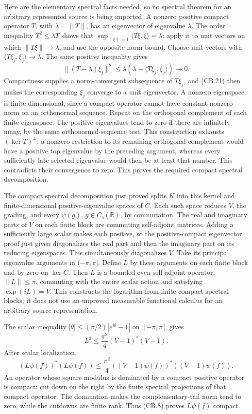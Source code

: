 \documentclass[
  11pt,
]{article}
\begin{document}
Here are the elementary spectral facts needed, so no spectral theorem
for an arbitrary represented source is being imported. A nonzero
positive compact operator \(T\), with \(\lambda=\|T\|\), has an
eigenvector of eigenvalue \(\lambda\). The order inequality
\(T^2\leq\lambda T\) shows that
\(\sup_{\|\xi\|=1}\langle T\xi,\xi\rangle=\lambda\): apply it to unit
vectors on which \(\|T\xi\|\to\lambda\), and use the opposite norm
bound. Choose unit vectors with
\(\langle T\xi_j,\xi_j\rangle\to\lambda\). The same positive inequality
gives \[
 \|(T-\lambda)\xi_j\|^2
 \leq\lambda(\lambda-\langle T\xi_j,\xi_j\rangle)
 \longrightarrow0.
 \tag{CB.21}
\] Compactness supplies a norm-convergent subsequence of \(T\xi_j\), and
(CB.21) then makes the corresponding \(\xi_j\) converge to a unit
eigenvector. A nonzero eigenspace is finite-dimensional, since a compact
operator cannot have constant nonzero norm on an orthonormal sequence.
Repeat on the orthogonal complement of each finite eigenspace. The
positive eigenvalues tend to zero if there are infinitely many, by the
same orthonormal-sequence test. This construction exhausts
\((\ker T)^\perp\): a nonzero restriction to its remaining orthogonal
complement would have a positive top eigenvalue by the preceding
argument, whereas every sufficiently late selected eigenvalue would then
be at least that number. This contradicts their convergence to zero.
This proves the required compact spectral decomposition.

The compact spectral decomposition just proved splits \(K\) into this
kernel and finite-dimensional positive-eigenvalue spaces of \(C\). Each
such space reduces \(V\), the grading, and every \(\psi(g)\),
\(g\in C_b(\mathbb R)\), by commutation. The real and imaginary parts of
\(V\) on each finite block are commuting self-adjoint matrices. Adding a
sufficiently large scalar makes each positive, so the positive-compact
eigenvector proof just given diagonalizes the real part and then the
imaginary part on its reducing eigenspaces. This simultaneously
diagonalizes \(V\). Take its principal eigenvalue arguments in
\((-\pi,\pi]\). Define \(L\) by these arguments on each finite block and
by zero on \(\ker C\). Then \(L\) is a bounded even self-adjoint
operator, \(\|L\|\leq\pi\), commuting with the entire scalar action and
satisfying \(\exp(iL)=V\). This constructs the logarithm from finite
compact spectral blocks; it does not use an unproved measurable
functional calculus for an arbitrary source representation.

The scalar inequality \(|\theta|\leq(\pi/2)|e^{i\theta}-1|\) on
\([-\pi,\pi]\) gives \[
 L^2\leq\frac{\pi^2}{4}(V-1)^*(V-1).
\] After scalar localization, \[
 (L\psi(f))^*(L\psi(f))
 \leq\frac{\pi^2}{4}
 ((V-1)\psi(f))^*((V-1)\psi(f)).
 \tag{CB.8}
\] An operator whose square modulus is dominated by a compact positive
operator is compact: cut down on the right by the finite spectral
projections of that compact operator. The domination makes the
complementary-tail norm tend to zero, while the cutdowns are finite
rank. Thus (CB.8) proves \(L\psi(f)\) compact.
\end{document}
